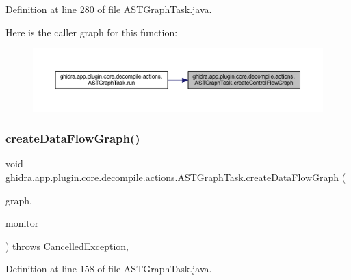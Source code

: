 Definition at line 280 of file A\+S\+T\+Graph\+Task.\+java.

Here is the caller graph for this function\+:
\nopagebreak
\begin{figure}[H]
\begin{center}
\leavevmode
\includegraphics[width=350pt]{classghidra_1_1app_1_1plugin_1_1core_1_1decompile_1_1actions_1_1_a_s_t_graph_task_ab294e8153df90959f5b9d7ca7bd53f26_icgraph}
\end{center}
\end{figure}
\mbox{\label{classghidra_1_1app_1_1plugin_1_1core_1_1decompile_1_1actions_1_1_a_s_t_graph_task_a696b176035c13b47e77ed1371f3511f5}} 
\subsubsection{\texorpdfstring{createDataFlowGraph()}{createDataFlowGraph()}}
{\footnotesize\ttfamily void ghidra.\+app.\+plugin.\+core.\+decompile.\+actions.\+A\+S\+T\+Graph\+Task.\+create\+Data\+Flow\+Graph (\begin{DoxyParamCaption}\item[{Graph\+Data}]{graph,  }\item[{Task\+Monitor}]{monitor }\end{DoxyParamCaption}) throws Cancelled\+Exception\hspace{0.3cm}{\ttfamily [inline]}, {\ttfamily [protected]}}



Definition at line 158 of file A\+S\+T\+Graph\+Task.\+java.

